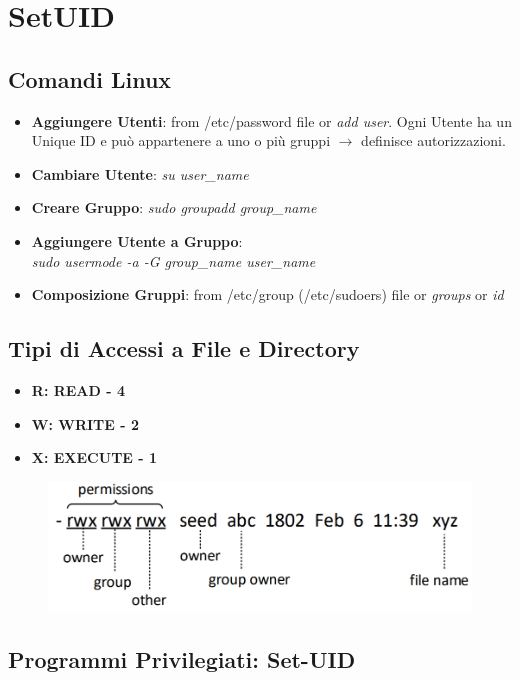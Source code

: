 \chapter{SetUID}

\section{Comandi Linux}

\begin{itemize}
    \item \textbf{Aggiungere Utenti}: from /etc/password file or \textit{add user}. 
    Ogni Utente ha un Unique ID e può appartenere a uno o più gruppi $ \rightarrow $ definisce autorizzazioni.
    \item \textbf{Cambiare Utente}: \textit{su user\_name}
    \item \textbf{Creare Gruppo}: \textit{sudo groupadd group\_name}
    \item \textbf{Aggiungere Utente a Gruppo}: \\\textit{sudo usermode -a -G group\_name user\_name}
    \item \textbf{Composizione Gruppi}: from /etc/group (/etc/sudoers) file or \textit{groups} or \textit{id}
\end{itemize}


\section{Tipi di Accessi a File e Directory}

\begin{itemize}
    \item \textbf{R: READ - 4}
    \item \textbf{W: WRITE - 2}
    \item \textbf{X: EXECUTE - 1}
\end{itemize}

\begin{figure}
    \centering
    \includegraphics[width=0.75\linewidth]{chapters/images3/autorizzazioni-file.png}
\end{figure}


\section{Programmi Privilegiati: Set-UID}

